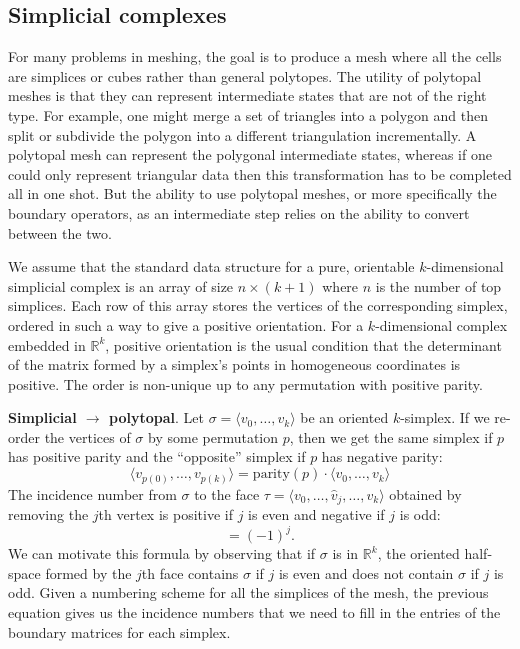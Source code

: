 \documentclass[twocolumn,leqno,twocolumn]{article}
\begin{document}
\subsection{Simplicial complexes}

For many problems in meshing, the goal is to produce a mesh where all the cells are simplices or cubes rather than general polytopes.
The utility of polytopal meshes is that they can represent intermediate states that are not of the right type.
For example, one might merge a set of triangles into a polygon and then split or subdivide the polygon into a different triangulation incrementally.
A polytopal mesh can represent the polygonal intermediate states, whereas if one could only represent triangular data then this transformation has to be completed all in one shot.
But the ability to use polytopal meshes, or more specifically the boundary operators, as an intermediate step relies on the ability to convert between the two.

We assume that the standard data structure for a pure, orientable $k$-dimensional simplicial complex is an array of size $n \times (k + 1)$ where $n$ is the number of top simplices.
Each row of this array stores the vertices of the corresponding simplex, ordered in such a way to give a positive orientation.
For a $k$-dimensional complex embedded in $\mathbb{R}^k$, positive orientation is the usual condition that the determinant of the matrix formed by a simplex's points in homogeneous coordinates is positive.
The order is non-unique up to any permutation with positive parity.

\textbf{Simplicial $\rightarrow$ polytopal}.
Let $\sigma = \langle v_0, \ldots, v_k\rangle$ be an oriented $k$-simplex.
If we re-order the vertices of $\sigma$ by some permutation $p$, then we get the same simplex if $p$ has positive parity and the ``opposite'' simplex if $p$ has negative parity:
\begin{equation}
    \langle v_{p(0)},\ldots,v_{p(k)}\rangle = \text{parity}(p)\cdot\langle v_0,\ldots, v_k\rangle
\end{equation}
The incidence number from $\sigma$ to the face $\tau = \langle v_0, \ldots, \hat v_j, \ldots, v_k\rangle$ obtained by removing the $j$th vertex is positive if $j$ is even and negative if $j$ is odd:
\begin{equation}
    [\sigma, \tau] = (-1)^j.
    \label{eq:simplicial-incidence-numbers}
\end{equation}
We can motivate this formula by observing that if $\sigma$ is in $\mathbb{R}^k$, the oriented half-space formed by the $j$th face contains $\sigma$ if $j$ is even and does not contain $\sigma$ if $j$ is odd.
Given a numbering scheme for all the simplices of the mesh, the previous equation gives us the incidence numbers that we need to fill in the entries of the boundary matrices for each simplex.
\end{document}
